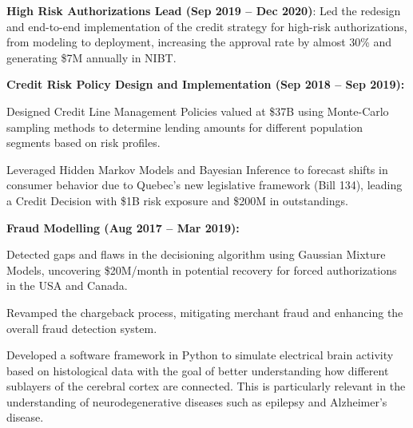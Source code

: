 \documentclass[]{deedy-resume-openfont}
\newcommand{\mybold}[1]{{\latobold\bfseries #1}}
\begin{document}
\begin{tightemize}

\item \mybold{High Risk Authorizations Lead (Sep 2019 – Dec 2020)}: Led the redesign and end-to-end implementation of the credit strategy for high-risk authorizations, from modeling to deployment, increasing the approval rate by almost 30\% and generating \$7M annually in NIBT.

\item \mybold{Credit Risk Policy Design and Implementation (Sep 2018 – Sep 2019):}
    \vspace{1mm} %

    \begin{tightemize}

    \item Designed Credit Line Management Policies valued at \$37B using Monte-Carlo sampling methods to determine lending amounts for different population segments based on risk profiles.
    \item Leveraged Hidden Markov Models and Bayesian Inference to forecast shifts in consumer behavior due to Quebec's new legislative framework (Bill 134), leading a Credit Decision with \$1B risk exposure and \$200M in outstandings.
    \end{tightemize}

\item \mybold{Fraud Modelling (Aug 2017 – Mar 2019):}
    \vspace{1mm} %

    \begin{tightemize}
    \item Detected gaps and flaws in the decisioning algorithm using Gaussian Mixture Models, uncovering \$20M/month in potential recovery for forced authorizations in the USA and Canada.
    \item Revamped the chargeback process, mitigating merchant fraud and enhancing the overall fraud detection system.
    \end{tightemize}

\end{tightemize}

\sectionsep


\begin{tightemize}
\item Developed a software framework in Python to simulate electrical brain activity based on histological data with the goal of better understanding how different sublayers of the cerebral cortex are connected.   This is particularly relevant in the understanding of neurodegenerative diseases such as epilepsy and Alzheimer's disease.

\end{tightemize}
\sectionsep
\end{document}
